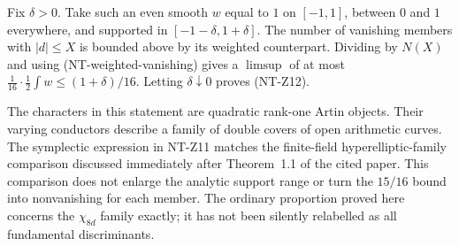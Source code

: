 Fix $\delta>0$.  Take such an even smooth $w$ equal to $1$ on
$[-1,1]$, between $0$ and $1$ everywhere, and supported in
$[-1-\delta,1+\delta]$.  The number of vanishing members with
$|d|\le X$ is bounded above by its weighted counterpart.  Dividing by
$N(X)$ and using (NT-weighted-vanishing) gives a $\limsup$ of at most
$\frac1{16}\cdot\frac12\int w\le(1+\delta)/16$.
Letting $\delta\downarrow0$ proves (NT-Z12).

The characters in this statement are quadratic rank-one Artin objects.
Their varying conductors describe a family of double covers of open
arithmetic curves.  The symplectic expression in NT-Z11 matches the
finite-field hyperelliptic-family comparison discussed immediately after
Theorem~1.1 of the cited paper.  This comparison does not enlarge the
analytic support range or turn the $15/16$ bound into nonvanishing for
each member.  The ordinary proportion proved here concerns the
$\chi_{8d}$ family exactly; it has not been silently relabelled as all
fundamental discriminants.

